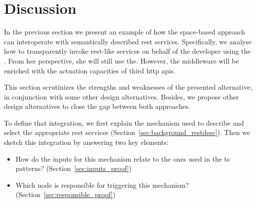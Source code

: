 \section{Discussion}

In the previous section we present an example of how the space-based approach can interoperate with semantically described \ac{rest} services.
Specifically, we analyse how to transparently invoke \ac{rest}-like services on behalf of the developer using the \Space{}. %
From her perspective, she will still use the.
However, the middleware will be enriched with the actuation capacities of third \ac{http} \acp{api}.


This section scrutinizes the strengths and weaknesses of the presented alternative, in conjunction with some other design alternatives.
Besides, we propose other design alternatives to close the gap between both approaches.



To define that integration, we first explain the mechanism used to describe and select the appropriate \ac{rest} services (Section~\ref{sec:background_restdesc}).
Then we sketch this integration by answering two key elements:
\begin{itemize}
  \item How do the inputs for this mechanism relate to the ones used in the \ac{ts} patterns? (Section~\ref{sec:inputs_proof})
  \item Which node is responsible for triggering this mechanism? (Section~\ref{sec:responsible_proof})
\end{itemize}















